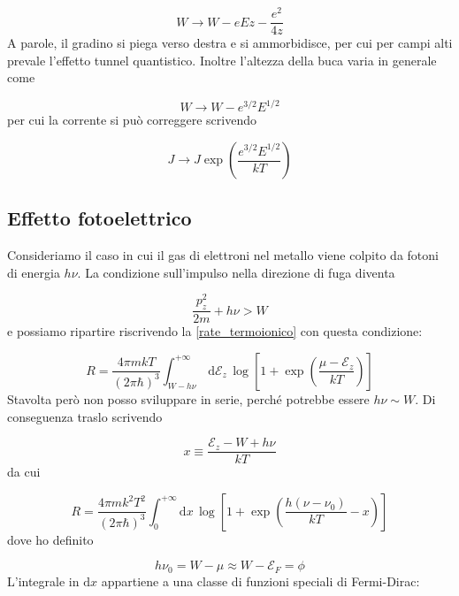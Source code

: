 \documentclass[a4paper]{report}
\begin{document}
\begin{equation}
    W \to W - e E z - \frac{e^2}{4z}
\end{equation}
A parole, il gradino si piega verso destra e si ammorbidisce, per cui per campi alti prevale l'effetto tunnel quantistico. Inoltre l'altezza della buca varia in generale come

\begin{equation}
    W \to W - e^{3/2}E^{1/2}
\end{equation}
per cui la corrente si può correggere scrivendo

\begin{equation}
    J \to J \exp\left(\frac{e^{3/2}E^{1/2}}{k T}\right)
\end{equation}

\newpage
\subsection{Effetto fotoelettrico}

Consideriamo il caso in cui il gas di elettroni nel metallo viene colpito da fotoni di energia $h\nu$. La condizione sull'impulso nella direzione di fuga diventa 

\begin{equation}
    \frac{p_z^2}{2m} + h\nu > W
\end{equation}
e possiamo ripartire riscrivendo la \eqref{rate_termoionico} con questa condizione:

\begin{equation}
    R = \frac{4\pi m k T}{(2\pi\hbar)^3} \int_{W-h\nu}^{+\infty}\, \mathrm{d}\mathcal{E}_z\,\log\left[1+ \exp\left(\frac{\mu-\mathcal{E}_z}{k T}\right) \right]
\end{equation}
Stavolta però non posso sviluppare in serie, perché potrebbe essere $h\nu \sim W$. Di conseguenza traslo scrivendo

\begin{equation}
    x \equiv \frac{\mathcal{E}_z - W + h\nu}{k T}
\end{equation}
da cui

\begin{equation}
    R = \frac{4\pi m k^2 T^2}{(2\pi\hbar)^3}\int_{0}^{+\infty}\mathrm{d}x \,\log \left[1+\exp\left(\frac{h(\nu-\nu_0)}{k T} - x\right)\right]
\end{equation}
dove ho definito

\begin{equation}
    h \nu_0 = W - \mu  \approx W - \mathcal{E}_F = \phi
\end{equation}
L'integrale in $\mathrm{d}x$ appartiene a una classe di funzioni speciali di Fermi-Dirac:
\end{document}

